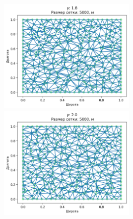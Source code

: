 \includegraphics[width=0.5\textwidth]{images/app1_10.png}
\includegraphics[width=0.5\textwidth]{images/app1_11.png}



